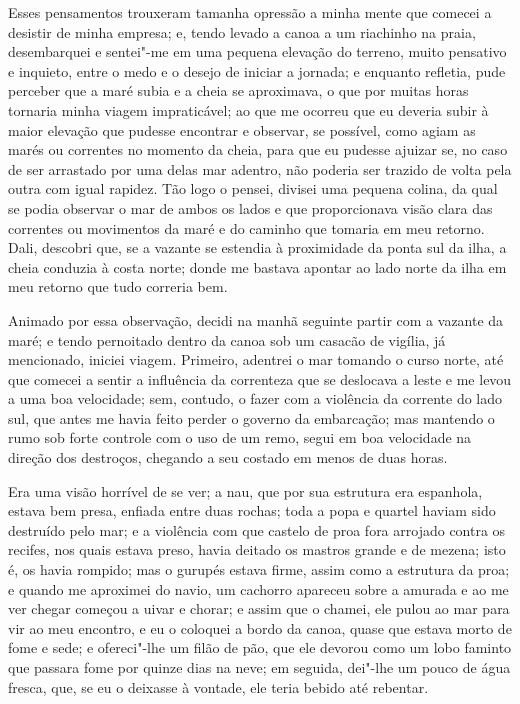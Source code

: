 Esses pensamentos trouxeram tamanha opressão a minha mente que comecei a
desistir de minha empresa; e, tendo levado a canoa a um riachinho na
praia, desembarquei e sentei"-me em uma pequena elevação do terreno,
muito pensativo e inquieto, entre o medo e o desejo de iniciar a
jornada; e enquanto refletia, pude perceber que a maré subia e a cheia
se aproximava, o que por muitas horas tornaria minha viagem
impraticável; ao que me ocorreu que eu deveria subir à maior elevação
que pudesse encontrar e observar, se possível, como agiam as marés ou
correntes no momento da cheia, para que eu pudesse ajuizar se, no caso
de ser arrastado por uma delas mar adentro, não poderia ser trazido de
volta pela outra com igual rapidez. Tão logo o pensei, divisei uma
pequena colina, da qual se podia observar o mar de ambos os lados e que
proporcionava visão clara das correntes ou movimentos da maré e do
caminho que tomaria em meu retorno. Dali, descobri que, se a vazante se
estendia à proximidade da ponta sul da ilha, a cheia conduzia à costa
norte; donde me bastava apontar ao lado norte da ilha em meu retorno que
tudo correria bem.

Animado por essa observação, decidi na manhã seguinte partir com a
vazante da maré; e tendo pernoitado dentro da canoa sob um casacão de
vigília, já mencionado, iniciei viagem. Primeiro, adentrei o mar tomando
o curso norte, até que comecei a sentir a influência da correnteza que
se deslocava a leste e me levou a uma boa velocidade; sem, contudo, o
fazer com a violência da corrente do lado sul, que antes me havia feito
perder o governo da embarcação; mas mantendo o rumo sob forte controle
com o uso de um remo, segui em boa velocidade na direção dos destroços,
chegando a seu costado em menos de duas horas.

Era uma visão horrível de se ver; a nau, que por sua estrutura era
espanhola, estava bem presa, enfiada entre duas rochas; toda a popa e
quartel haviam sido destruído pelo mar; e a violência com que castelo de
proa fora arrojado contra os recifes, nos quais estava preso, havia
deitado os mastros grande e de mezena; isto é, os havia rompido; mas o
gurupés estava firme, assim como a estrutura da proa; e quando me
aproximei do navio, um cachorro apareceu sobre a amurada e ao me ver
chegar começou a uivar e chorar; e assim que o chamei, ele pulou ao mar
para vir ao meu encontro, e eu o coloquei a bordo da canoa, quase que
estava morto de fome e sede; e ofereci"-lhe um filão de pão, que ele
devorou como um lobo faminto que passara fome por quinze dias na neve;
em seguida, dei"-lhe um pouco de água fresca, que, se eu o deixasse à
vontade, ele teria bebido até rebentar.


